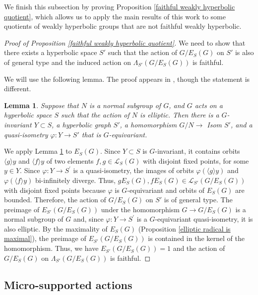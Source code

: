\documentclass[11pt,letterpaper]{article}
\newtheorem{lem}[thm]{Lemma}
\theoremstyle{definition}
\theoremstyle{remark}
\begin{document}
We finish this subsection by proving Proposition \ref{faithful weakly hyperbolic quotient}, which allows us to apply the main results of this work to some quotients of weakly hyperbolic groups that are not faithful weakly hyperbolic. 

\begin{proof}[Proof of Proposition \ref{faithful weakly hyperbolic quotient}]
We need to show that there exists a hyperbolic space $S'$ such that the action of $G/E_S(G)$ on $S'$ is also of general type and the induced action on $\Lambda_{S'}(G/E_S(G))$ is faithful.

We will use the following lemma. The proof appears in \cite{BFGS}, though the statement is different.

\begin{lem} \cite[Lemma 4.10]{BFGS} \label{construction of a new hyp space} Suppose that $N$ is a normal subgroup of $G$, and $G$ acts on a hyperbolic space $S$ such that the action of $N$ is elliptic. Then there is a $G$-invariant  $Y \subset S$, a hyperbolic graph $S'$, a homomorphism $G / N \rightarrow$ Isom $S'$, and a quasi-isometry $\varphi: Y \rightarrow S'$ that is $G$-equivariant.
\end{lem}

We apply Lemma \ref{construction of a new hyp space} to $E_S(G)$. Since $Y \subset S$ is $G$-invariant, it contains orbits $\langle g \rangle y$ and $\langle f \rangle y$ of two elements $f, g \in \mathcal{L}_S(G)$ with disjoint fixed points, for some $y \in Y$. Since $\varphi: Y \rightarrow S^{\prime}$ is a quasi-isometry, the images of orbits $\varphi(\langle g \rangle y)$ and $\varphi(\langle f \rangle y)$ bi-infinitely diverge. Thus, $gE_S(G), fE_S(G) \in \mathcal{L}_{S'}(G/ E_S(G))$ with disjoint fixed points because $\varphi$ is $G$-equivariant and orbits of $E_S(G)$ are bounded. Therefore, the action of $G/E_S(G)$ on $S'$ is of general type. The preimage of $E_{S'}(G/E_S(G))$ under the homomorphism $G \rightarrow G/E_S(G)$ is a normal subgroup of $G$ and, since $\varphi: Y \rightarrow S^{\prime}$ is a $G$-equivariant quasi-isometry, it is also elliptic. By the maximality of $E_S(G)$ (Proposition \ref{elliptic radical is maximal}), the preimage of $E_{S'}(G/E_S(G))$ is contained in the kernel of the homomorphism. Thus, we have $E_{S'}(G/E_S(G)) =1$ and the action of $G/E_S(G)$ on $\Lambda_{S'}(G/E_S(G))$ is faithful.
\end{proof}

\subsection{Micro-supported actions}\label{micro-supported actions}
\end{document}
